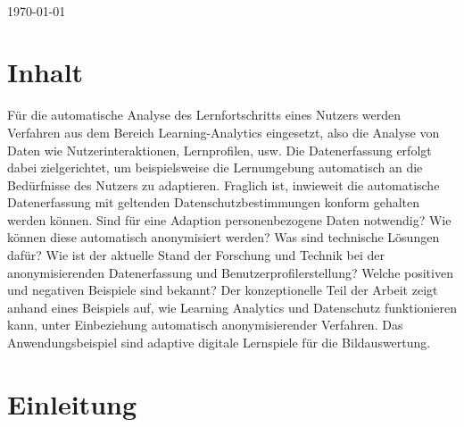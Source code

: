 \documentclass[a4paper, 12pt]{article}
\begin{document}
\begin{titlepage}
\begin{minipage}{0.4\textwidth}
\begin{flushleft}
\end{flushleft}

\end{minipage}\\[2cm]



{\large \today}\\[2cm] %

\vfill %

\end{titlepage}

\tableofcontents

\newpage

\section{Inhalt}

Für die automatische Analyse des Lernfortschritts eines Nutzers werden Verfahren aus dem Bereich Learning-Analytics
eingesetzt, also die Analyse von Daten wie Nutzerinteraktionen, Lernprofilen, usw. Die
Datenerfassung erfolgt dabei zielgerichtet, um beispielsweise die Lernumgebung automatisch an die
Bedürfnisse des Nutzers zu adaptieren. Fraglich ist, inwieweit die automatische Datenerfassung mit
geltenden Datenschutzbestimmungen konform gehalten werden können. Sind für eine Adaption
personenbezogene Daten notwendig? Wie können diese automatisch anonymisiert werden? Was
sind technische Lösungen dafür? Wie ist der aktuelle Stand der Forschung und Technik bei der
anonymisierenden Datenerfassung und Benutzerprofilerstellung? Welche positiven und negativen
Beispiele sind bekannt?
Der konzeptionelle Teil der Arbeit zeigt anhand eines Beispiels auf, wie Learning Analytics und
Datenschutz funktionieren kann, unter Einbeziehung automatisch anonymisierender Verfahren. Das
Anwendungsbeispiel sind adaptive digitale Lernspiele für die Bildauswertung.

\section{Einleitung}
\end{document}
